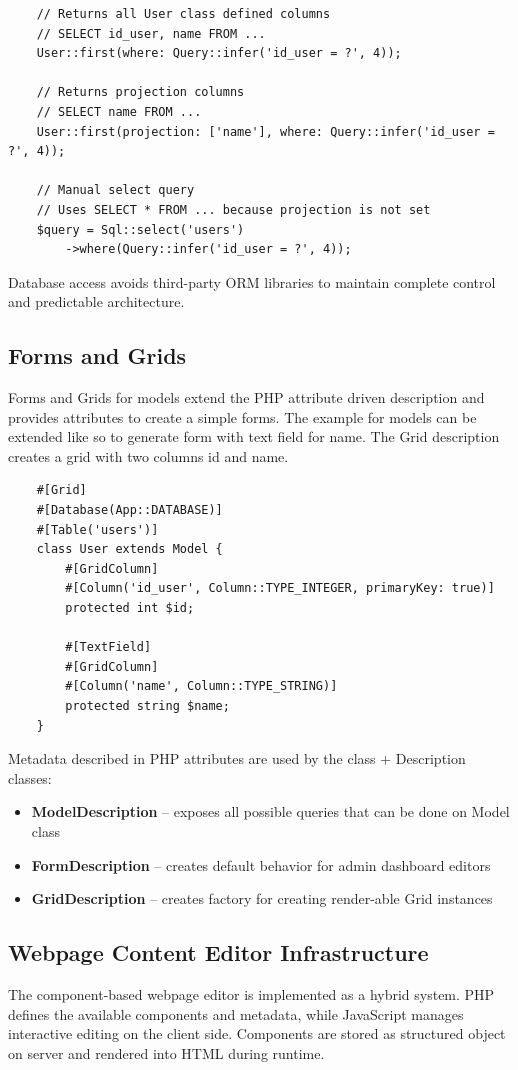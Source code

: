 \begin{verbatim}
    // Returns all User class defined columns
    // SELECT id_user, name FROM ...
    User::first(where: Query::infer('id_user = ?', 4));

    // Returns projection columns
    // SELECT name FROM ...
    User::first(projection: ['name'], where: Query::infer('id_user = ?', 4));

    // Manual select query
    // Uses SELECT * FROM ... because projection is not set
    $query = Sql::select('users')
        ->where(Query::infer('id_user = ?', 4));
\end{verbatim}

Database access avoids third-party ORM libraries to maintain complete control and predictable architecture.

\subsection{Forms and Grids}\label{subsec:form-metadata}
Forms and Grids for models extend the PHP attribute driven description and provides attributes to create a simple forms.
The example for models can be extended like so to generate form with text field for name.
The Grid description creates a grid with two columns id and name.

\begin{verbatim}
    #[Grid]
    #[Database(App::DATABASE)]
    #[Table('users')]
    class User extends Model {
        #[GridColumn]
        #[Column('id_user', Column::TYPE_INTEGER, primaryKey: true)]
        protected int $id;

        #[TextField]
        #[GridColumn]
        #[Column('name', Column::TYPE_STRING)]
        protected string $name;
    }
\end{verbatim}

Metadata described in PHP attributes are used by the class + Description classes:

\begin{itemize}
    \item \textbf{ModelDescription} -- exposes all possible queries that can be done on Model class
    \item \textbf{FormDescription} -- creates default behavior for admin dashboard editors
    \item \textbf{GridDescription} -- creates factory for creating render-able Grid instances
\end{itemize}

\subsection{Webpage Content Editor Infrastructure}\label{subsec:webpage-content-editor-infrastructure}
The component-based webpage editor is implemented as a hybrid system.
PHP defines the available components and metadata, while JavaScript manages interactive editing on the client side.
Components are stored as structured object on server and rendered into HTML during runtime.

